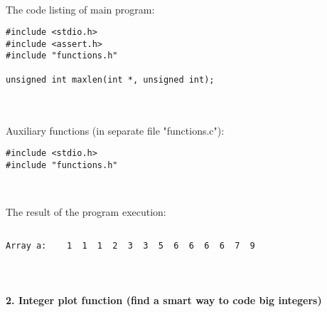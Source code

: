 \documentclass{article}
\begin{document}
\paragraph{}\
\paragraph{}\
\paragraph{}\

		\rmfamily
		\noindent The code listing of main program:
		\begin{verbatim}
#include <stdio.h>
#include <assert.h>
#include "functions.h"

unsigned int maxlen(int *, unsigned int);
		\end{verbatim}


\paragraph{}\

	\rmfamily
	
	Auxiliary functions (in separate file "functions.c"):
	
	\begin{verbatim} 
#include <stdio.h>
#include "functions.h"

\end{verbatim}




	
	\rmfamily\
	
		\noindent The result of the program execution:
		
	\ttfamily
	\begin{lstlisting}[language=bash]

Array a:    1  1  1  2  3  3  5  6  6  6  6  7  9

	\end{lstlisting}
	
	
\paragraph{}\

	
	
	\rmfamily
	
	\paragraph{2. Integer plot function (find a smart way to code big integers) }\
	
\end{document}
